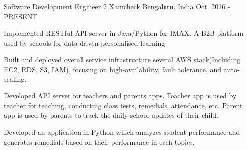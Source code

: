

\begin{cventries}

  \cventry
    {Software Development Engineer 2} %
    {Xamcheck} %
    {Bengaluru, India} %
    {Oct. 2016 - PRESENT} %
    {
      \begin{cvitems} %
        \item {Implemented RESTful API server in Java/Python for IMAX. A B2B platform used by schools for data driven personalised learning}
        \item {Built and deployed overall service infrastructure several AWS stack(Including EC2, RDS, S3, IAM), focusing on high-availability, fault tolerance, and auto-scaling.}
        \item {Developed API server for teachers and parents apps. Teacher app is used by teacher for teaching, conducting class tests, remedials, attendance, etc. Parent app is used by parents to track the daily school updates of their child.}
        \item {Developed an application in Python which analyzes student performance and generates remedials based on their performance in each topics.}
      \end{cvitems}
    }


\end{cventries}
